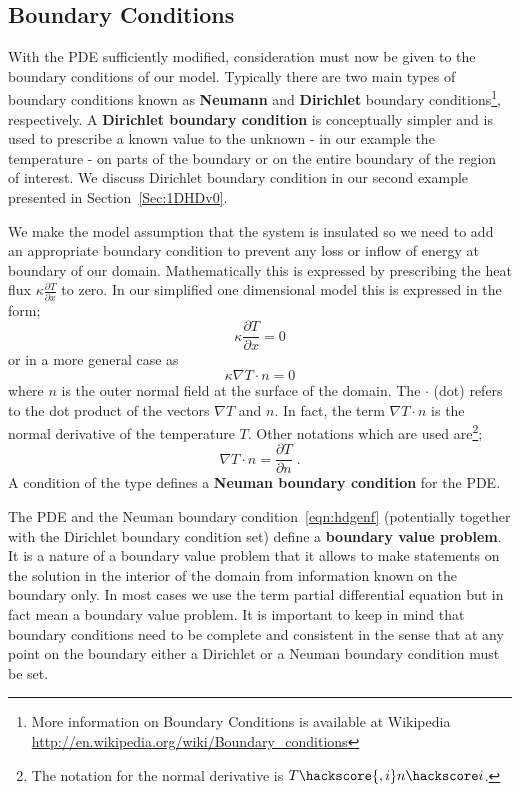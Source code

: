 \subsection{Boundary Conditions}
\label{SEC BOUNDARY COND}
With the PDE sufficiently modified, consideration must now be given to the boundary conditions of our model. Typically there are two main types of boundary conditions known as \textbf{Neumann} and \textbf{Dirichlet} boundary conditions\footnote{More information on Boundary Conditions is available at Wikipedia \url{http://en.wikipedia.org/wiki/Boundary_conditions}}, respectively. 
A \textbf{Dirichlet boundary condition} is conceptually simpler and is used to prescribe a known value to the unknown - in our example the temperature - on parts of the boundary or on the entire boundary of the region of interest. 
We discuss Dirichlet boundary condition in our second example presented in Section~\ref{Sec:1DHDv0}.

We make the model assumption that the system is insulated so we need
to add an appropriate boundary condition to prevent
any loss or inflow of energy at boundary of our domain. Mathematically this is expressed by prescribing
the heat flux $\kappa \frac{\partial T}{\partial x}$  to zero. In our simplified one dimensional model this is expressed
in the form;
\begin{equation}
\kappa \frac{\partial T}{\partial x}  = 0 
\end{equation}
or in a more general case as
\begin{equation}\label{NEUMAN 1}
\kappa \nabla T \cdot n  = 0 
\end{equation}
where $n$  is the outer normal field  at the surface of the domain. 
The $\cdot$ (dot) refers to the  dot product of the vectors $\nabla T$ and $n$. In fact, the term $\nabla T \cdot n$ is the normal derivative of 
the temperature $T$. Other notations which are used are\footnote{The \esc notation for the normal
derivative is $T\hackscore{,i} n\hackscore i$.};
\begin{equation}
\nabla T \cdot n  = \frac{\partial T}{\partial n} \; .
\end{equation}
A condition of the type  defines a \textbf{Neuman boundary condition} for the PDE. 

The PDE  
and the Neuman boundary condition~\ref{eqn:hdgenf} (potentially together with the Dirichlet boundary condition set)  define a \textbf{boundary value problem}. 
It is a nature of a boundary value problem that it allows to make statements on the solution in the
interior of the domain from information known on the boundary only. In most cases
we use the term partial differential equation but in fact mean a boundary value problem. 
It is important to keep in mind that boundary conditions need to be complete and consistent in the sense that 
at any point on the boundary either a Dirichlet or a Neuman boundary condition must be set.

